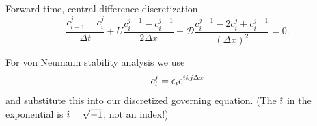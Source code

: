 \newcommand{\derivNote}[1]{%
  \par\addvspace{0.5\baselineskip}%
  \noindent\hspace*{0.5\linewidth}$\Big\downarrow$\ #1\par
  \addvspace{0.5\baselineskip}%
  }

\begin{solution}
    Forward time, central difference discretization
    \[
        \frac{c_{i+1}^{j} - c_i^{j}}{\Delta t}
        + U\frac{c_{i}^{j+1} - c_{i}^{j-1}}{2\Delta x}
        - \mathcal{D}\frac{c_{i}^{j+1} - 2c_i^{j} + c_{i}^{j-1}}{(\Delta x)^2}
        = 0.
    \]

    For von Neumann stability analysis we use
    \[c_i^j = \epsilon_i e^{\hat{\imath} kj\Delta x}\]
    and substitute this into our discretized governing equation.
    (The $\hat{\imath}$ in the exponential is \(\hat{\imath}=\sqrt{-1}\), not an index!)


\end{solution}
